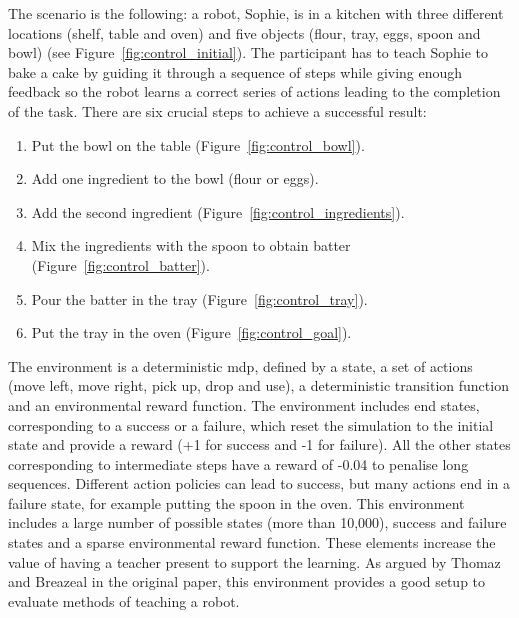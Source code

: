 The scenario is the following: a robot, Sophie, is in a kitchen with three different locations (shelf, table and oven) and five objects (flour, tray, eggs, spoon and bowl) (see Figure~\ref{fig:control_initial}). The participant has to teach Sophie to bake a cake by guiding it through a sequence of steps while giving enough feedback so the robot learns a correct series of actions leading to the completion of the task. There are six crucial steps to achieve a successful result:

\begin{enumerate}
	\item Put the bowl on the table (Figure~\ref{fig:control_bowl}).
	\item Add one ingredient to the bowl (flour or eggs).
	\item Add the second ingredient (Figure~\ref{fig:control_ingredients}).
	\item Mix the ingredients with the spoon to obtain batter (Figure~\ref{fig:control_batter}).
	\item Pour the batter in the tray (Figure~\ref{fig:control_tray}).
	\item Put the tray in the oven (Figure~\ref{fig:control_goal}).
\end{enumerate}

The environment is a deterministic \gls{mdp}, defined by a state, a set of actions (move left, move right, pick up, drop and use), a deterministic transition function and an environmental reward function. The environment includes end states, corresponding to a success or a failure, which reset the simulation to the initial state and provide a reward (+1 for success and -1 for failure). All the other states corresponding to intermediate steps have a reward of -0.04 to penalise long sequences. Different action policies can lead to success, but many actions end in a failure state, for example putting the spoon in the oven. This environment includes a large number of possible states (more than 10,000), success and failure states and a sparse environmental reward function. These elements increase the value of having a teacher present to support the learning. As argued by Thomaz and Breazeal in the original paper, this environment provides a good setup to evaluate methods of teaching a robot.

